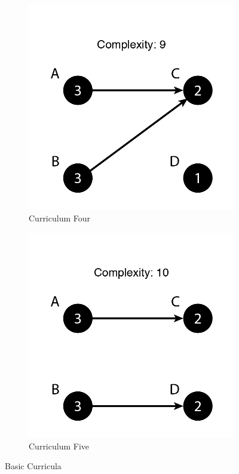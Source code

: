 \documentclass[botnum, fleqn]{unmeethesis}
\begin{document}
\begin{figure}
\begin{subfigure}[h!]{.3\linewidth}
\includegraphics[width=\linewidth]{./figures/Simple9-2.png}
\caption{Curriculum Four}\label{fig:simple92}
\end{subfigure}
\begin{subfigure}[h!]{.3\linewidth}
\includegraphics[width=\linewidth]{./figures/Simple10.png}
\caption{Curriculum Five}\label{fig:simple10}
\end{subfigure}

\caption{Basic Curricula}
\label{fig:simple}
\end{figure}
\end{document}
